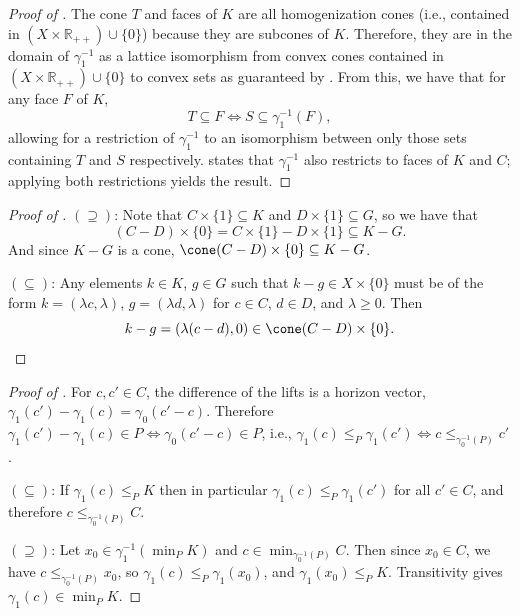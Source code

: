 \documentclass{article}
\theoremstyle{plain}
\theoremstyle{definition}
\theoremstyle{remark}
\begin{document}
\begin{proof}[\hypertarget{loc:bijection_of_faces_containing_a_subset.proof}{}Proof of ]

The cone $T$ and faces of $K$ are all homogenization cones (i.e., contained in $(X  \times \mathbb{R}_{++}) \cup \{ 0 \}$) because they are subcones of $K$. Therefore, they are in the domain of $\gamma_1^{-1}$ as a lattice isomorphism from convex cones contained in $(X \times \mathbb{R}_{++})\cup\{0\}$ to convex sets as guaranteed by . From this, we have that for any face $F$ of $K$,
\begin{equation*}
T \subseteq F \iff S \subseteq \gamma_1^{-1}(F),
\end{equation*}
allowing for a restriction of $\gamma_1^{-1}$ to an isomorphism between only those sets containing $T$ and $S$ respectively.
 states that $\gamma_1^{-1}$ 
also restricts to faces of $K$ and $C$; applying both restrictions yields the result.
\end{proof}
\begin{proof}[\hypertarget{loc:differences_in_the_lifting.proof}{}Proof of ]

$(\supseteq)$: Note that $C \times \{1\} \subseteq K$
and $D \times \{1\} \subseteq G$, so we have that 
\begin{equation*}
(C-D) \times \{0\} = C \times \{1\} - D \times \{1\} \subseteq K-G.
\end{equation*}
And since $K-G$ is a cone,
$\cone(C-D) \times \{0\} \subseteq K-G$.

$(\subseteq)$: Any elements $k \in K$, $g \in G$
such that $k-g \in X \times \{0\}$ must be of the form
$k = (\lambda c, \lambda)$, $g =  (\lambda d,  \lambda)$ for $c \in C$,
$d \in D$, and
$\lambda \ge 0$. Then
\begin{equation*}
k-g =  (\lambda(c-d), 0) \in \cone(C-D) \times \{0\}.
\end{equation*}
\end{proof}
\begin{proof}[\hypertarget{loc:minima_dehomogenize_to_the_induced_order.proof}{}Proof of ]

For $c, c' \in C$, the difference of the lifts is a horizon vector, $\gamma_1(c') - \gamma_1(c) = \gamma_0(c'-c)$. Therefore 
$\gamma_1(c')-\gamma_1(c)  \in P  \iff \gamma_0(c' - c)  \in P$, i.e., $\gamma_1(c) \leq_{P} \gamma_1(c') \iff c \leq_{\gamma_0^{-1}(P)} c'$.

$(\subseteq)$: If $\gamma_1(c) \le_{P} K$ then in particular $\gamma_1(c) \le_{P} \gamma_1(c')$ for all $c' \in C$, and therefore $c \le_{\gamma_0^{-1}(P)} C$.

$(\supseteq)$: Let $x_0 \in \gamma_1^{-1}(\min_P K)$ and $c \in \min_{\gamma_0^{-1}(P)}C$. Then since $x_{0} \in C$, we have $c \le_{\gamma_0^{-1}(P)} x_0$, so $\gamma_1(c) \le_{P} \gamma_1(x_0)$, and $\gamma_1(x_0) \le_{P} K$. Transitivity gives $\gamma_1(c) \in \min_P K$.
\end{proof}
\end{document}
